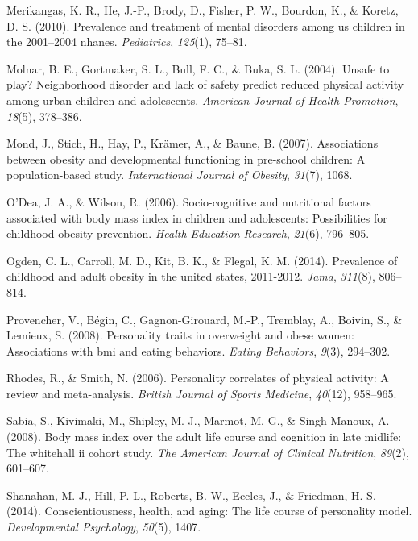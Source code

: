 \documentclass[man]{apa6}
\begin{document}
\leavevmode\hypertarget{ref-merikangas2010prevalence}{}%
Merikangas, K. R., He, J.-P., Brody, D., Fisher, P. W., Bourdon, K., \& Koretz, D. S. (2010). Prevalence and treatment of mental disorders among us children in the 2001--2004 nhanes. \emph{Pediatrics}, \emph{125}(1), 75--81.

\leavevmode\hypertarget{ref-molnar2004unsafe}{}%
Molnar, B. E., Gortmaker, S. L., Bull, F. C., \& Buka, S. L. (2004). Unsafe to play? Neighborhood disorder and lack of safety predict reduced physical activity among urban children and adolescents. \emph{American Journal of Health Promotion}, \emph{18}(5), 378--386.

\leavevmode\hypertarget{ref-mond2007associations}{}%
Mond, J., Stich, H., Hay, P., Krämer, A., \& Baune, B. (2007). Associations between obesity and developmental functioning in pre-school children: A population-based study. \emph{International Journal of Obesity}, \emph{31}(7), 1068.

\leavevmode\hypertarget{ref-o2006socio}{}%
O'Dea, J. A., \& Wilson, R. (2006). Socio-cognitive and nutritional factors associated with body mass index in children and adolescents: Possibilities for childhood obesity prevention. \emph{Health Education Research}, \emph{21}(6), 796--805.

\leavevmode\hypertarget{ref-ogden2014prevalence}{}%
Ogden, C. L., Carroll, M. D., Kit, B. K., \& Flegal, K. M. (2014). Prevalence of childhood and adult obesity in the united states, 2011-2012. \emph{Jama}, \emph{311}(8), 806--814.

\leavevmode\hypertarget{ref-provencher2008personality}{}%
Provencher, V., Bégin, C., Gagnon-Girouard, M.-P., Tremblay, A., Boivin, S., \& Lemieux, S. (2008). Personality traits in overweight and obese women: Associations with bmi and eating behaviors. \emph{Eating Behaviors}, \emph{9}(3), 294--302.

\leavevmode\hypertarget{ref-rhodes2006personality}{}%
Rhodes, R., \& Smith, N. (2006). Personality correlates of physical activity: A review and meta-analysis. \emph{British Journal of Sports Medicine}, \emph{40}(12), 958--965.

\leavevmode\hypertarget{ref-sabia2008body}{}%
Sabia, S., Kivimaki, M., Shipley, M. J., Marmot, M. G., \& Singh-Manoux, A. (2008). Body mass index over the adult life course and cognition in late midlife: The whitehall ii cohort study. \emph{The American Journal of Clinical Nutrition}, \emph{89}(2), 601--607.

\leavevmode\hypertarget{ref-shanahan2014conscientiousness}{}%
Shanahan, M. J., Hill, P. L., Roberts, B. W., Eccles, J., \& Friedman, H. S. (2014). Conscientiousness, health, and aging: The life course of personality model. \emph{Developmental Psychology}, \emph{50}(5), 1407.
\end{document}
